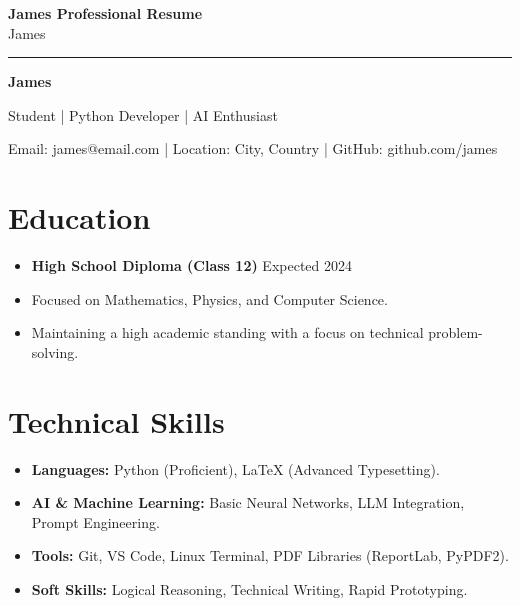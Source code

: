 \documentclass[11pt, a4paper]{article}
\begin{document}
\begin{center}
    {\LARGE \textbf{James Professional Resume}}\\[0.35em]
    {\normalsize James}
\end{center}

\vspace{0.4em}
\hrule
\vspace{0.8em}

\centerline{\textbf{\Huge James}}
\centerline{Student | Python Developer | AI Enthusiast}
\centerline{Email: james@email.com | Location: City, Country | GitHub: github.com/james}

\section*{Education}
\begin{itemize}
    \item \textbf{High School Diploma (Class 12)} \hfill Expected 2024
    \item Focused on Mathematics, Physics, and Computer Science.
    \item Maintaining a high academic standing with a focus on technical problem-solving.
\end{itemize}

\section*{Technical Skills}
\begin{itemize}
    \item \textbf{Languages:} Python (Proficient), LaTeX (Advanced Typesetting).
    \item \textbf{AI \& Machine Learning:} Basic Neural Networks, LLM Integration, Prompt Engineering.
    \item \textbf{Tools:} Git, VS Code, Linux Terminal, PDF Libraries (ReportLab, PyPDF2).
    \item \textbf{Soft Skills:} Logical Reasoning, Technical Writing, Rapid Prototyping.
\end{itemize}
\end{document}
